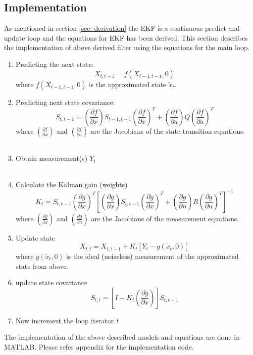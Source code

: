 \documentclass[12pt]{article}
\begin{document}
\subsection{Implementation}
As mentioned in section \ref{sec: derivation}  the EKF is a continuous predict and update loop and the equations for EKF has been derived. This section describes the implementation of above derived filter using the equations for the main loop.  \\
\begin{enumerate}
\item Predicting the next state: 
\begin{equation}
X_{t,t-1} = f(X_{t-1,t-1},0)
\label{eq:Xnext}
\end{equation}
where $f(X_{t-1,t-1},0)$ is the approximated state $\tilde{x}_t$. \\
\item Predicting next state covariance: 
\begin{equation}
S_{t,t-1} =
\left( \frac{\partial f}{\partial x} \right)
S_{t-1,t-1} \left(\frac{\partial f}{\partial x}\right)^T
+ \left( \frac{\partial f}{\partial a} \right) Q
\left(\frac{\partial f}{\partial a}\right)^T
\end{equation}
where $\left(\frac{\partial f}{\partial x}\right)$ and $\left(\frac{\partial f}{\partial a}\right)$ are the Jacobians of the state transition equations. \\
\\
\item Obtain measurement(s) $Y_t$ \\
\\
\item Calculate the Kalman gain (weights)
\begin{equation}
K_t = S_{t,t-1} 
\left( \frac{\partial g}{\partial x} \right)^T
\left[
\left( \frac{\partial g}{\partial x} \right)
S_{t,t-1}
\left( \frac{\partial g}{\partial x} \right)^T
+
\left( \frac{\partial g}{\partial n} \right)
R
\left( \frac{\partial g}{\partial n} \right)^T
\right]^{-1}
\end{equation}
where $\left(\frac{\partial g}{\partial x}\right)$ and $\left(\frac{\partial g}{\partial n}\right)$ are the Jacobians of the measurement equations.

\item Update state
\begin{equation}
X_{t,t} = X_{t,t-1} + K_t [Y_t - g(\tilde{x}_t,0)]
\end{equation}
where $g(\tilde{x}_t,0)$ is the ideal (noiseless) measurement of the approximated state from above.

\item update state covariance
\begin{equation}
S_{t,t} = \left[ I - K_t
\left( \frac{\partial g}{\partial x} \right) \right] S_{t,t-1}
\end{equation}

\item Now increment the loop iterator \textit{t}

\end{enumerate}
The implementation of the above described models and equations are done in MATLAB. Please refer appendix for the implementation code. 
\end{document}
